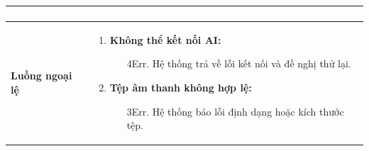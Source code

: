 {\begin{tabularx}{\textwidth}{|>{\raggedright\arraybackslash}p{3.5cm}|>{\raggedright\arraybackslash}X|}
\begin{enumerate}
\begin{enumerate}
    \end{enumerate}
\end{enumerate} \\
\hline
\textbf{Luồng ngoại lệ} &
\begin{enumerate}
    \item \textbf{Không thể kết nối AI:}
    \begin{enumerate}
        \item[4Err.] Hệ thống trả về lỗi kết nối và đề nghị thử lại.
    \end{enumerate}
    \item \textbf{Tệp âm thanh không hợp lệ:}
    \begin{enumerate}
        \item[3Err.] Hệ thống báo lỗi định dạng hoặc kích thước tệp.
    \end{enumerate}
\end{enumerate} \\
\hline
\end{tabularx}
}
